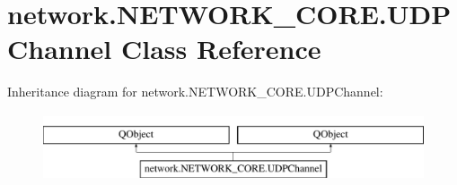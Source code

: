 \hypertarget{classnetwork_1_1NETWORK__CORE_1_1UDPChannel}{}\section{network.\+N\+E\+T\+W\+O\+R\+K\+\_\+\+C\+O\+R\+E.\+U\+D\+P\+Channel Class Reference}
\label{classnetwork_1_1NETWORK__CORE_1_1UDPChannel}
Inheritance diagram for network.\+N\+E\+T\+W\+O\+R\+K\+\_\+\+C\+O\+R\+E.\+U\+D\+P\+Channel\+:\begin{figure}[H]
\begin{center}
\leavevmode
\includegraphics[height=2.000000cm]{classnetwork_1_1NETWORK__CORE_1_1UDPChannel}
\end{center}
\end{figure}
